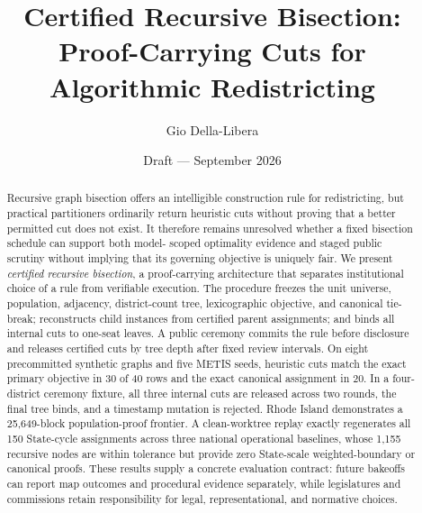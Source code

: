 \documentclass[12pt]{article}
\title{Certified Recursive Bisection:\\
Proof-Carrying Cuts for Algorithmic Redistricting}
\author{Gio Della-Libera}
\date{Draft --- September 2026}
\begin{document}
\maketitle

\begin{abstract}
Recursive graph bisection offers an intelligible construction rule for
redistricting, but practical partitioners ordinarily return heuristic cuts
without proving that a better permitted cut does not exist. It therefore
remains unresolved whether a fixed bisection schedule can support both model-
scoped optimality evidence and staged public scrutiny without implying that
its governing objective is uniquely fair. We present \emph{certified recursive
bisection}, a proof-carrying architecture that separates institutional choice
of a rule from verifiable execution. The procedure freezes the unit universe,
population, adjacency, district-count tree, lexicographic objective, and
canonical tie-break; reconstructs child instances from certified parent
assignments; and binds all internal cuts to one-seat leaves. A public ceremony
commits the rule before disclosure and releases certified cuts by tree depth
after fixed review intervals. On eight precommitted synthetic graphs and five
METIS seeds, heuristic cuts match the exact primary objective in 30 of 40 rows
and the exact canonical assignment in 20. In a four-district ceremony fixture,
all three internal cuts are released across two rounds, the final tree binds,
and a timestamp mutation is rejected. Rhode Island demonstrates a 25,649-block
population-proof frontier. A clean-worktree replay exactly regenerates all 150
State-cycle assignments across three national operational baselines, whose
1,155 recursive nodes are within tolerance but provide zero State-scale
weighted-boundary or canonical proofs. These results supply a concrete
evaluation contract: future bakeoffs can report map outcomes and procedural
evidence separately, while legislatures and commissions retain responsibility
for legal, representational, and normative choices.
\end{abstract}












\end{document}
